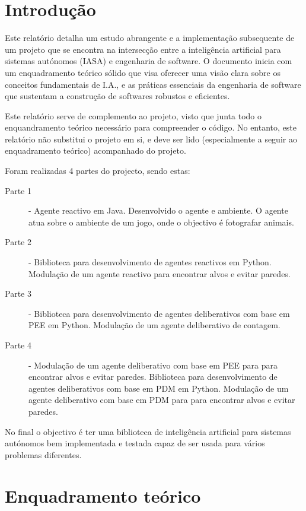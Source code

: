 \documentclass[a4paper,12pt]{article}
\begin{document}


\newpage
\tableofcontents

\newpage
\listoffigures
\listoftables

\newpage
\section{Introdução} \label{introducao}
Este relatório detalha um estudo abrangente e a implementação subsequente de um projeto que se encontra na intersecção entre a inteligência artificial para sistemas autónomos (IASA) e engenharia de software. 
O documento inicia com um enquadramento teórico sólido que visa oferecer uma visão clara sobre os conceitos fundamentais de I.A., e as práticas essenciais da engenharia de software que sustentam a construção de softwares robustos e eficientes.

Este relatório serve de complemento ao projeto, visto que junta todo o enquandramento teórico necessário para compreender o código. No entanto, este relatório não substitui o projeto em si, e deve ser lido (especialmente a seguir ao enquadramento teórico) acompanhado do projeto.

Foram realizadas 4 partes do projecto, sendo estas:
\begin{description}
	\item[Parte 1] - Agente reactivo em Java. Desenvolvido o agente e ambiente. O agente atua sobre o ambiente de um jogo, onde o objectivo é fotografar animais.
	\item[Parte 2] - Biblioteca para desenvolvimento de agentes reactivos em Python. Modulação de um agente reactivo para encontrar alvos e evitar paredes.
	\item[Parte 3] - Biblioteca para desenvolvimento de agentes deliberativos com base em PEE em Python. Modulação de um agente deliberativo de contagem.
	\item[Parte 4] - Modulação de um agente deliberativo com base em PEE para para encontrar alvos e evitar paredes.  Biblioteca para desenvolvimento de agentes deliberativos com base em PDM em Python. Modulação de um agente deliberativo com base em PDM para para encontrar alvos e evitar paredes.
\end{description}

No final o objectivo é ter uma biblioteca de inteligência artificial para sistemas autónomos bem implementada e testada capaz de ser usada para vários problemas diferentes.

\newpage
\section{Enquadramento teórico} \label{enquadramento_teorico}
\end{document}

